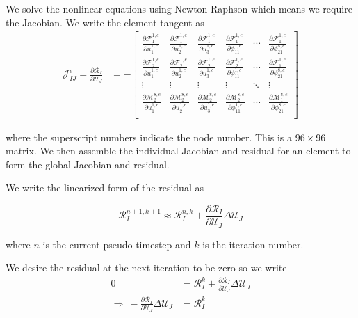 We solve the nonlinear equations using Newton Raphson which means we require the Jacobian. We write the element tangent as
\begin{align*}
\mathcal{J}_{IJ}^e  = \frac{\partial \mathcal{R}_I}{\partial \mathcal{U}_J} &= -\left[\begin{array}{cccccc}
\frac{\partial \mathcal{F}_{1}^{1,e}}{\partial u_1^{1,e}} & \frac{\partial \mathcal{F}_{1}^{1,e}}{\partial u_2^{1,e}} & \frac{\partial \mathcal{F}_{1}^{1,e}}{\partial u_3^{1,e}} & \frac{\partial \mathcal{F}_{1}^{1,e}}{\partial \phi_{11}^{1,e}} & \cdots & \frac{\partial \mathcal{F}_{1}^{1,e}}{\partial \phi_{21}^{8,e}}\\
\frac{\partial \mathcal{F}_{2}^{1,e}}{\partial u_1^{1,e}} & \frac{\partial \mathcal{F}_{2}^{1,e}}{\partial u_2^{1,e}} & \frac{\partial \mathcal{F}_{2}^{1,e}}{\partial u_3^{1,e}} & \frac{\partial \mathcal{F}_{2}^{1,e}}{\partial \phi_{11}^{1,e}} & \cdots & \frac{\partial \mathcal{F}_{1}^{1,e}}{\partial \phi_{21}^{8,e}}\\
\vdots & \vdots & \vdots & \vdots & \ddots & \vdots\\
\frac{\partial \mathcal{M}_{2}^{8,e}}{\partial u_1^{1,e}} & \frac{\partial \mathcal{M}_{2}^{8,e}}{\partial u_2^{1,e}} & \frac{\partial \mathcal{M}_{2}^{8,e}}{\partial u_3^{1,e}} & \frac{\partial \mathcal{M}_{2}^{8,e}}{\partial \phi_{11}^{1,e}} & \cdots & \frac{\partial \mathcal{M}_{1}^{8,e}}{\partial \phi_{21}^{8,e}}\\
\end{array}\right]
\end{align*}

where the superscript numbers indicate the node number. This is a $96 \times 96$ matrix. We then assemble the individual Jacobian and residual for an element to form the global Jacobian and residual.

We write the linearized form of the residual as

\begin{equation}
\mathcal{R}_I^{n+1,k+1} \approx \mathcal{R}_I^{n,k} + \frac{\partial \mathcal{R}_I}{\partial \mathcal{U}_J} \Delta \mathcal{U}_J
\end{equation}

where $n$ is the current pseudo-timestep and $k$ is the iteration number.

We desire the residual at the next iteration to be zero so we write
\begin{equation}
\begin{aligned}
0 &= \mathcal{R}_I^k + \frac{\partial \mathcal{R}_I}{\partial \mathcal{U}_J} \Delta \mathcal{U}_J\\
\Rightarrow\ -\frac{\partial \mathcal{R}_I}{\partial \mathcal{U}_J} \Delta \mathcal{U}_J &= \mathcal{R}_I^k\\
\end{aligned}
\end{equation}

